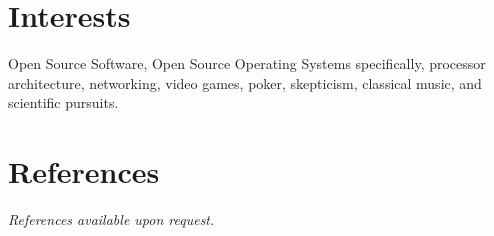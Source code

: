 \documentclass[margin,line]{resume}
\begin{document}
\begin{resume}
	\section{\mysidestyle Interests} 
	Open Source Software, Open Source Operating Systems specifically, processor
	architecture, networking, video games, poker, skepticism, classical music,
	and scientific pursuits.

	\section{\mysidestyle References}
	{\sl References available upon request.}
\end{resume}
\end{document}
